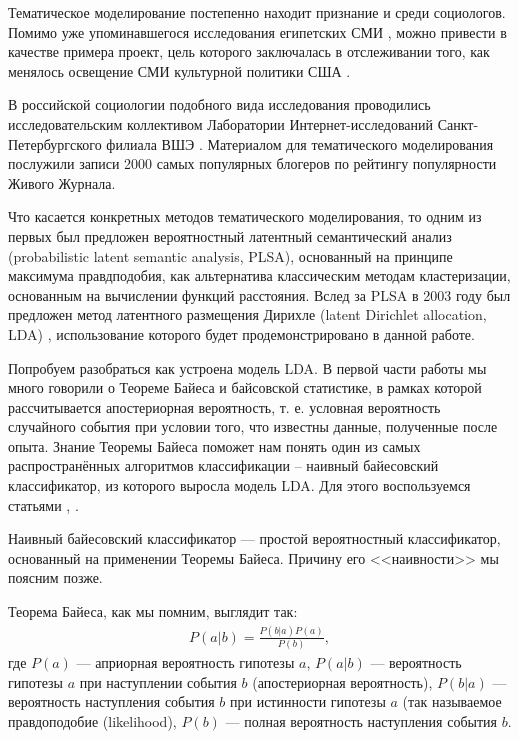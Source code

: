 Тематическое моделирование постепенно находит признание и среди социологов. Помимо уже упоминавшегося исследования египетских СМИ \cite{EgyptianUprising2012}, можно привести в качестве примера проект, цель которого заключалась в отслеживании того, как менялось освещение СМИ культурной политики США \cite{poetics_topics}.

В российской социологии подобного вида исследования проводились исследовательским коллективом Лаборатории Интернет-исследований Санкт-Петербургского филиала ВШЭ \cite{kolcovalda}. Материалом для тематического моделирования послужили записи 2000 самых популярных блогеров по рейтингу популярности Живого Журнала. %

Что касается конкретных методов тематического моделирования, то одним из первых был предложен вероятностный латентный семантический анализ (probabilistic latent semantic analysis, PLSA), основанный на принципе максимума правдподобия, как альтернатива классическим методам кластеризации, основанным на вычислении функций расстояния. Вслед за PLSA в 2003 году был предложен метод латентного размещения Дирихле (latent Dirichlet allocation, LDA) \cite{LDAOrigin}, использование которого будет продемонстрировано в данной работе.

Попробуем разобраться как устроена модель LDA. В первой части работы мы много говорили о Теореме Байеса и байсовской статистике, в рамках которой рассчитывается апостериорная вероятность, т. е. условная вероятность случайного события при условии того, что известны данные, полученные после опыта. Знание Теоремы Байеса поможет нам понять один из самых распространённых алгоритмов классификации -- наивный байесовский классификатор, из которого выросла модель LDA. Для этого воспользуемся статьями \cite{surfburd_bies_lda}, \cite{bies_class}.

Наивный байесовский классификатор — простой вероятностный классификатор, основанный на применении Теоремы Байеса. Причину его <<наивности>> мы поясним позже.

Теорема Байеса, как мы помним, выглядит так:
\begin{eqnarray}
P(a|b)=\frac{P(b|a)P(a)}{P(b)},
\end{eqnarray} 
где $P(a)$ --- априорная вероятность гипотезы $a$, $P(a|b)$ --- вероятность гипотезы $a$ при наступлении события $b$ (апостериорная вероятность), $P(b|a)$ --- вероятность наступления события $b$ при истинности гипотезы $a$ (так называемое правдоподобие (likelihood), $P(b)$ --- полная вероятность наступления события $b$. 

